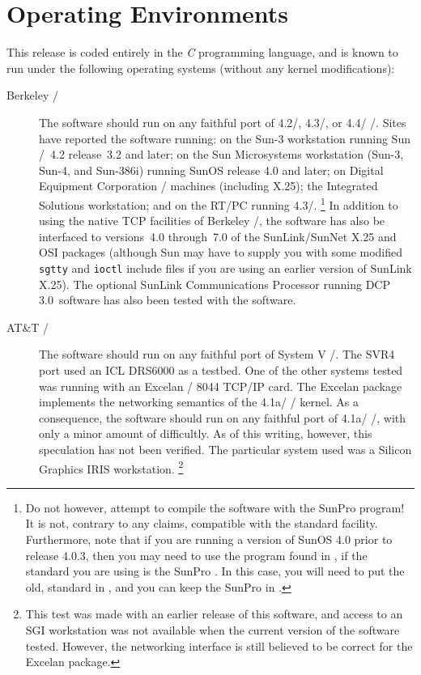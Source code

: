 \section	{Operating Environments}
This release is coded entirely in the {\em C\/} programming
language\cite{C.Language},
and is known to run under the following operating systems
(without any kernel modifications):
\begin{description}
\item	[Berkeley \unix/]
The software should run on any faithful port of 4.2\bsd/, 4.3\bsd/,
or 4.4\bsd/ \unix/.
Sites have reported the software running:
on the Sun-3 workstation running Sun \unix/~4.2 release~3.2 and later;
on the Sun Microsystems workstation (Sun-3, Sun-4, and Sun-386i) running SunOS
release 4.0 and later;
on Digital Equipment Corporation \ultrix/ machines (including X.25);
the Integrated Solutions workstation;
and
on the RT/PC running 4.3\bsd/.%
\footnote{Do not however, attempt to compile the software with the SunPro
 program!
It is not, contrary to any claims, compatible with the standard 
facility.
Furthermore,
note that if you are running a version of SunOS 4.0 prior to release 4.0.3,
then you may need to use the  program found in ,
if the standard  you are using is the SunPro .
In this case,
you will need to put the old,
standard  in ,
and you can keep the SunPro  in .}
In addition to using the native TCP facilities of Berkeley \unix/,
the software has also be interfaced to versions~4.0 through~7.0 
of the SunLink/SunNet X.25 and OSI packages
(although Sun may have to supply you with some modified \verb"sgtty" and
\verb"ioctl" include files if you are using an earlier version of SunLink
X.25).
The optional SunLink Communications Processor running DCP 3.0~software has
also been tested with the software.

\item	[AT\&T \unix/]
The software should run on any faithful port of System V \unix/.
The SVR4 port used an ICL DRS6000 as a testbed.
One of the other systems tested was running with an
Excelan \exos/ 8044 TCP/IP card.
The Excelan package implements the networking semantics of the 4.1a\bsd/ \unix/
kernel.
As a consequence,
the software should run on any faithful port of 4.1a\bsd/ \unix/,
with only a minor amount of difficultly.
As of this writing, however,
this speculation has not been verified.
The particular system used was a Silicon Graphics IRIS workstation.%
\footnote{This test was made with an earlier release of this software,
and access to an SGI workstation was not available when the current version of
the software tested.
However, the networking interface is still believed to be correct for the
Excelan package.}


\end{description}
